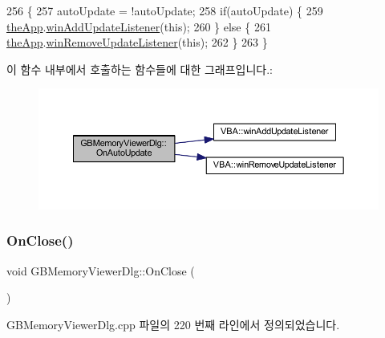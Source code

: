 \begin{DoxyCode}
256 \{
257   autoUpdate = !autoUpdate;
258   \textcolor{keywordflow}{if}(autoUpdate) \{
259     \mbox{\hyperlink{_v_b_a_8cpp_a8095a9d06b37a7efe3723f3218ad8fb3}{theApp}}.\mbox{\hyperlink{class_v_b_a_af0712f70a90d023ab8327a366be08174}{winAddUpdateListener}}(\textcolor{keyword}{this});
260   \} \textcolor{keywordflow}{else} \{
261     \mbox{\hyperlink{_v_b_a_8cpp_a8095a9d06b37a7efe3723f3218ad8fb3}{theApp}}.\mbox{\hyperlink{class_v_b_a_a2d31a0656df2230310aa8dc9e3a735d3}{winRemoveUpdateListener}}(\textcolor{keyword}{this});    
262   \}  
263 \}
\end{DoxyCode}
이 함수 내부에서 호출하는 함수들에 대한 그래프입니다.\+:
\nopagebreak
\begin{figure}[H]
\begin{center}
\leavevmode
\includegraphics[width=350pt]{class_g_b_memory_viewer_dlg_a7c7da28ae22f8a9f5f8ad3e6bb358949_cgraph}
\end{center}
\end{figure}
\mbox{\label{class_g_b_memory_viewer_dlg_aff8b13af0ecd94d5ef812dbfcb73728a}} 
\subsubsection{\texorpdfstring{On\+Close()}{OnClose()}}
{\footnotesize\ttfamily void G\+B\+Memory\+Viewer\+Dlg\+::\+On\+Close (\begin{DoxyParamCaption}{ }\end{DoxyParamCaption})\hspace{0.3cm}{\ttfamily [protected]}}



G\+B\+Memory\+Viewer\+Dlg.\+cpp 파일의 220 번째 라인에서 정의되었습니다.


